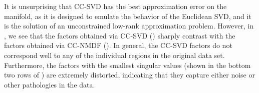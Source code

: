 It is unsurprising that CC-SVD has the best approximation error on the manifold, as it is designed to emulate the behavior of the Euclidean SVD, and it is the solution of an unconstrained low-rank approximation problem. However, in , we see that the factors obtained via CC-SVD () sharply contrast with the factors obtained via CC-NMDF (). In general, the CC-SVD factors do not correspond well to any of the individual regions in the original data set. Furthermore, the factors with the smallest singular values (shown in the bottom two rows of ) are extremely distorted, indicating that they capture either noise or other pathologies in the data. 
